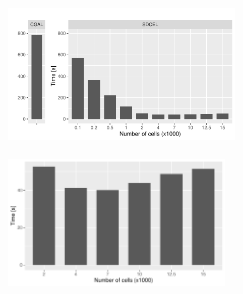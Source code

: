 \documentclass[varwidth,border=2pt]{standalone}
\begin{document}
    \begin{figure}
        \centering
        \setcaptionsubtype
        \captionsetup{justification=centering}
        \begin{subfigure}{6cm}
            \centering\includegraphics[width=6cm]{CA}
            \caption{}
        \end{subfigure}%
        \begin{subfigure}{6cm}
            \centering
            \includegraphics[width=5.75cm]{CA_sample}
            \caption{}
        \end{subfigure}
    \end{figure}
\end{document}
